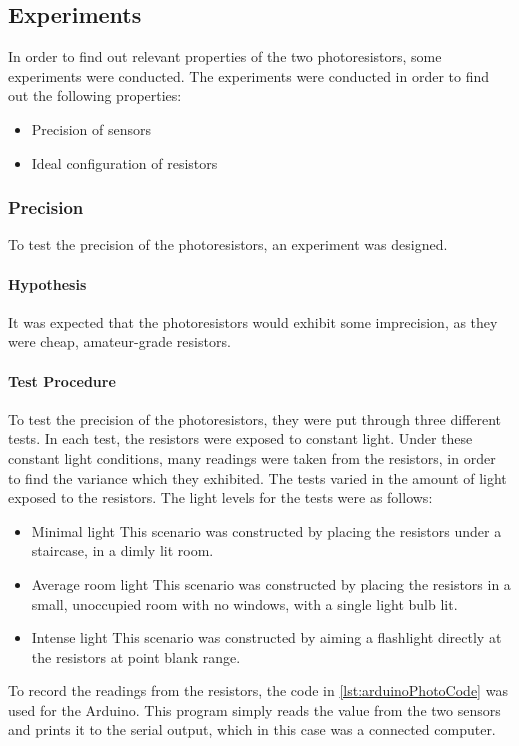 \subsection{Experiments}
In order to find out relevant properties of the two photoresistors, some experiments were conducted. The experiments were conducted in order to find out the following properties:

\begin{itemize}
  \item Precision of sensors
  \item Ideal configuration of resistors
\end{itemize}

\subsubsection{Precision}\label{subsub:precision}
To test the precision of the photoresistors, an experiment was designed.
\paragraph{Hypothesis}
It was expected that the photoresistors would exhibit some imprecision, as they were cheap, amateur-grade resistors.
\paragraph{Test Procedure}
To test the precision of the photoresistors, they were put through three different tests. In each test, the resistors were exposed to constant light. Under these constant light conditions, many readings were taken from the resistors, in order to find the variance which they exhibited.
The tests varied in the amount of light exposed to the resistors. The light levels for the tests were as follows:

\begin{itemize}
  \item Minimal light
  This scenario was constructed by placing the resistors under a staircase, in a dimly lit room.
  \item Average room light
  This scenario was constructed by placing the resistors in a small, unoccupied room with no windows, with a single light bulb lit.
  \item Intense light
  This scenario was constructed by aiming a flashlight directly at the resistors at point blank range.
\end{itemize}

To record the readings from the resistors, the code in \cref{lst:arduinoPhotoCode} was used for the Arduino. This program simply reads the value from the two sensors and prints it to the serial output, which in this case was a connected computer.

